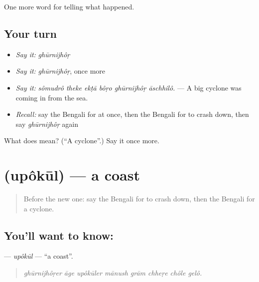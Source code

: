 \begin{grammarlens}[title={What you've built}]
One more word for telling what happened.
\end{grammarlens}

\subsection*{Your turn}
\begin{itemize}
\raggedright
  \item \emph{Say it:} \emph{ghūrnijhôṛ}
  \item \emph{Say it:} \emph{ghūrnijhôṛ}, once more
  \item \emph{Say it:} \emph{sômudrô theke ekṭā bôṛo ghūrnijhôṛ āschhilô.} — A big cyclone was coming in from the sea.
  \item \emph{Recall:} say the Bengali for at once, then the Bengali for to crash down, then say \emph{ghūrnijhôṛ} again
\end{itemize}

\begin{tcolorbox}[breakable,colback=teal!4,colframe=teal!35!black,title={Before you move on}]
What does  mean? (\textquotedblleft{}A cyclone\textquotedblright{}.) Say it once more.
\end{tcolorbox}
\section[\texorpdfstring{\bn{উপকূল} (upôkūl)}{উপকূল (upôkūl)}]{ (upôkūl) — a coast}

\label{lesson:BN-C288-upokul}



\begin{quote}
Before the new one: say the Bengali for to crash down, then the Bengali for a cyclone.
\end{quote}

\subsection*{You'll want to know: }
\textbf{} — \emph{upôkūl} — \textquotedblleft{}a coast\textquotedblright{}.

\begin{quote}
       
\end{quote}

\begin{quote}
\emph{ghūrnijhôṛer āge upôkūler mānush grām chheṛe chôle gelô.}
\end{quote}

